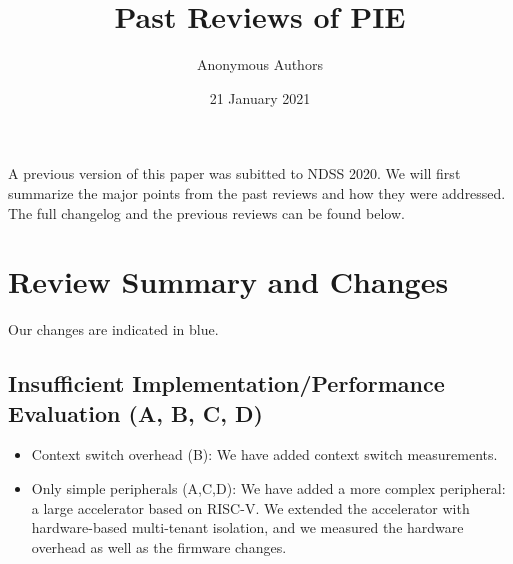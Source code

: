 \documentclass[9pt]{article}
\author{Anonymous Authors}
\date{21 January 2021}
\begin{document}
\title{Past Reviews of PIE}
\maketitle

A previous version of this paper was subitted to NDSS 2020. We will first summarize the major points from the past reviews and how they were addressed. The full changelog and the previous reviews can be found below.

\section{Review Summary and Changes}
Our changes are indicated in blue.

\subsection{Insufficient Implementation/Performance Evaluation (A, B, C, D)}

\begin{itemize}
    \item Context switch overhead (B): {\color{blue} We have added context switch measurements.}
    \item Only simple peripherals (A,C,D): {\color{blue} We have added a more complex peripheral: a large accelerator based on RISC-V. We extended the accelerator with hardware-based multi-tenant isolation, and we measured the hardware overhead as well as the firmware changes.}
\end{itemize}
\end{document}
